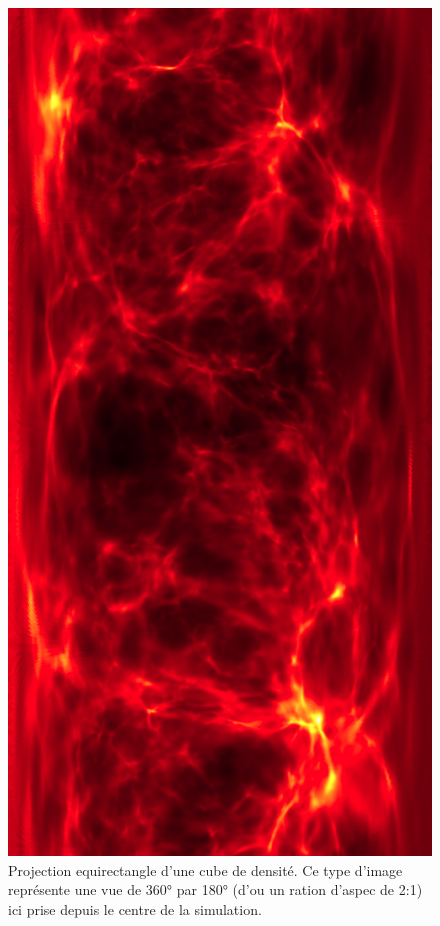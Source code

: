 \begin{figure}[bth]
        \includegraphics[height=.95\textheight]{img/04/equi.png} 
        \caption{Projection equirectangle d'une cube de densité.
        Ce type d'image représente une vue de 360° par 180° (d'ou un ration d'aspec de 2:1) ici prise depuis le centre de la simulation.}
 		\label{fig:equirectangle}
\end{figure}

